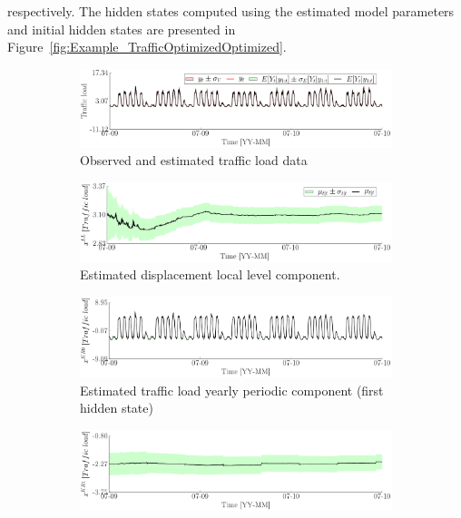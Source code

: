  respectively.
The hidden states computed using the estimated model parameters and initial hidden states are presented in Figure~\ref{fig:Example_TrafficOptimizedOptimized}.





\begin{figure}[h!]
\begin{center}
\begin{subfigure}{\linewidth}
\includegraphics[width=0.9\linewidth]{./docfigs/Example_TRAFFIC/optim_param_optim_initialhiddenstate/TrafficLoad_ObservedPredicted.pdf} 
\caption{Observed and estimated traffic load data}
\end{subfigure}
\begin{subfigure}{\linewidth}
\includegraphics[width=0.9\linewidth]{./docfigs/Example_TRAFFIC/optim_param_optim_initialhiddenstate/TrafficLoad_LL_1.pdf}
\caption{Estimated displacement local level component.}
\end{subfigure}
\begin{subfigure}{\linewidth}
\includegraphics[width=0.9\linewidth]{./docfigs/Example_TRAFFIC/optim_param_optim_initialhiddenstate/TrafficLoad_KR0_2.pdf} 
\caption{Estimated traffic load yearly periodic component (first hidden state)}
\end{subfigure}
\begin{subfigure}{\linewidth}
\includegraphics[width=0.9\linewidth]{./docfigs/Example_TRAFFIC/optim_param_optim_initialhiddenstate/TrafficLoad_KR1_3.pdf}

\end{subfigure}
\end{center}
\end{figure}
